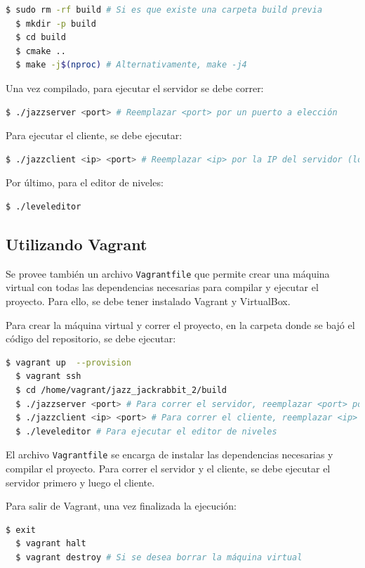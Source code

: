 \documentclass[titlepage,a4paper]{article}
\begin{document}
\begin{lstlisting}[language=sh,caption=Compilación del Proyecto, captionpos=b]
  $ sudo rm -rf build # Si es que existe una carpeta build previa
  $ mkdir -p build
  $ cd build
  $ cmake ..
  $ make -j$(nproc) # Alternativamente, make -j4
\end{lstlisting}

Una vez compilado, para ejecutar el servidor se debe correr:

\begin{lstlisting}[language=sh,caption=Ejecución del Servidor, captionpos=b]
  $ ./jazzserver <port> # Reemplazar <port> por un puerto a elección
\end{lstlisting}

Para ejecutar el cliente, se debe ejecutar:

\begin{lstlisting}[language=sh,caption=Ejecución del Cliente, captionpos=b]
  $ ./jazzclient <ip> <port> # Reemplazar <ip> por la IP del servidor (localhost) y <port> por el puerto
\end{lstlisting}

Por último, para el editor de niveles:

\begin{lstlisting}[language=sh,caption=Ejecución del Editor de Niveles, captionpos=b]
  $ ./leveleditor
\end{lstlisting}

\subsection{Utilizando Vagrant}
Se provee también un archivo \texttt{Vagrantfile} que permite crear una máquina virtual con todas las dependencias necesarias para compilar y ejecutar el proyecto. Para ello, se debe tener instalado Vagrant y VirtualBox.

Para crear la máquina virtual y correr el proyecto, en la carpeta donde se bajó el código del repositorio, se debe ejecutar:

\begin{lstlisting}[language=sh,caption=Creación de la Máquina Virtual, captionpos=b]
  $ vagrant up  --provision
  $ vagrant ssh
  $ cd /home/vagrant/jazz_jackrabbit_2/build
  $ ./jazzserver <port> # Para correr el servidor, reemplazar <port> por un puerto a elección
  $ ./jazzclient <ip> <port> # Para correr el cliente, reemplazar <ip> por la IP del servidor (localhost) y <port> por el puerto
  $ ./leveleditor # Para ejecutar el editor de niveles
\end{lstlisting}

El archivo \texttt{Vagrantfile} se encarga de instalar las dependencias necesarias y compilar el proyecto. Para correr el servidor y el cliente, se debe ejecutar el servidor primero y luego el cliente.

Para salir de Vagrant, una vez finalizada la ejecución:

\begin{lstlisting}[language=sh,caption=Salir de Vagrant, captionpos=b]
  $ exit
  $ vagrant halt
  $ vagrant destroy # Si se desea borrar la máquina virtual
\end{lstlisting}
\end{document}
